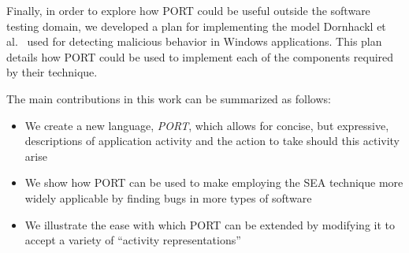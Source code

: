 Finally,
in order to explore how PORT could be useful outside the software testing
domain, we developed a plan
for implementing the model Dornhackl et al.~\cite{Dornhackl2014} used for
detecting malicious behavior in Windows applications.
This plan details how PORT could be used to
implement each of the components required by their technique.


The main contributions in this work can be summarized as follows:

\begin{itemize}

\item{We create a new language, {\em PORT},
  which allows for concise, but expressive, descriptions of
    application activity and the action to take should this activity arise}

\item{We show how PORT can be used to make employing the SEA technique
  more widely applicable by finding bugs in more types of software}

\item{We illustrate the ease with which PORT can be extended by modifying
  it to accept a variety of ``activity representations''}

\end{itemize}


